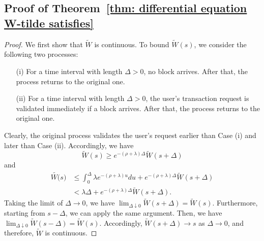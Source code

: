 \documentclass[12pt, letterpaper]{article}
\begin{document}
\subsection{Proof of Theorem~\ref{thm: differential equation W-tilde satisfies}}
\begin{proof}
We first show that $\tilde{W}$ is continuous. To bound $\tilde{W}(s)$, we consider the following two processes:
\begin{enumerate}
    \item[(i)] For a time interval with length $\Delta > 0$, no block arrives. After that, the process returns to the original one.
    \item[(ii)] For a time interval with length $\Delta > 0$, the user's transaction request is validated immediately if a block arrives. After that, the process returns to the original one.
\end{enumerate}
Clearly, the original process validates the user's request earlier than Case (i) and later than Case (ii). Accordingly, we have
\begin{equation}
    \tilde{W}(s) \ge e^{-(\rho + \lambda) \Delta} \tilde{W}(s + \Delta)
\end{equation}
and
\begin{align}
    \tilde{W(}s) & \le \int_0^\Delta \lambda e^{-(\rho + \lambda)u} du + e^{-(\rho + \lambda) \Delta} \tilde{W}(s + \Delta)\\
    & < \lambda \Delta +  e^{-(\rho + \lambda) \Delta} \tilde{W}(s + \Delta).
\end{align}
Taking the limit of $\Delta \to 0$, we have $\lim_{\Delta \downarrow 0}\tilde{W}(s + \Delta) = \tilde{W}(s)$. Furthermore, starting from $s - \Delta$, we can apply the same argument. Then, we have $\lim_{\Delta \downarrow 0}\tilde{W}(s - \Delta) = \tilde{W}(s)$. Accordingly, $\tilde{W}(s + \Delta) \to s$ as $\Delta \to 0$, and therefore, $\tilde{W}$ is continuous.


\end{proof}
\end{document}
